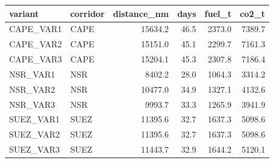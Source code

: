 \begin{tabular}{llrrrr}
\toprule
  variant & corridor &  distance\_nm &  days &  fuel\_t &  co2\_t \\
\midrule
CAPE\_VAR1 &     CAPE &      15634.2 &  46.5 &  2373.0 & 7389.7 \\
CAPE\_VAR2 &     CAPE &      15151.0 &  45.1 &  2299.7 & 7161.3 \\
CAPE\_VAR3 &     CAPE &      15204.1 &  45.3 &  2307.8 & 7186.4 \\
 NSR\_VAR1 &      NSR &       8402.2 &  28.0 &  1064.3 & 3314.2 \\
 NSR\_VAR2 &      NSR &      10477.0 &  34.9 &  1327.1 & 4132.6 \\
 NSR\_VAR3 &      NSR &       9993.7 &  33.3 &  1265.9 & 3941.9 \\
SUEZ\_VAR1 &     SUEZ &      11395.6 &  32.7 &  1637.3 & 5098.6 \\
SUEZ\_VAR2 &     SUEZ &      11395.6 &  32.7 &  1637.3 & 5098.6 \\
SUEZ\_VAR3 &     SUEZ &      11443.7 &  32.9 &  1644.2 & 5120.1 \\
\bottomrule
\end{tabular}
